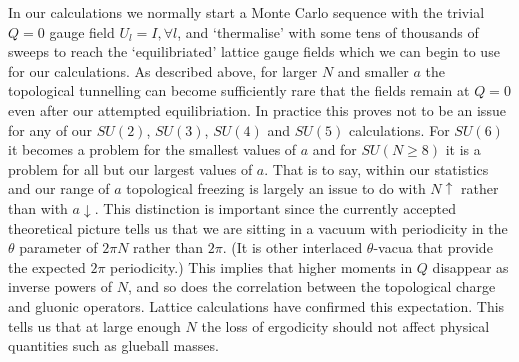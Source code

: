 \documentclass[12pt]{article}
\begin{document}
In our calculations we normally start a Monte Carlo sequence with the trivial $Q=0$
gauge field $U_l=I, \forall l$, and `thermalise' with some tens of thousands of sweeps
to reach the `equilibriated' lattice gauge fields which we can begin to use for our
calculations. As described above, for larger $N$ and smaller $a$ the topological 
tunnelling can become
sufficiently rare that the fields remain at $Q=0$ even after our attempted
equilibriation. In practice this proves not to be an issue for any of our $SU(2)$, $SU(3)$,
$SU(4)$ and $SU(5)$ calculations. For $SU(6)$ it becomes a problem for the smallest values
of $a$ and for $SU(N\geq 8)$ it is a problem for all but our largest values of $a$.
That is to say, within our statistics and our range of $a$ topological freezing
is largely an issue to do with $N\uparrow$ rather than with $a\downarrow$.
This distinction is important since the currently accepted theoretical picture
%
\cite{Witten_98}
%
tells us that we are sitting in a vacuum with periodicity in the $\theta$ parameter of
$2\pi N$ rather than $2\pi$. (It is other interlaced $\theta$-vacua that provide the
expected $2\pi$ periodicity.) This implies that higher moments in $Q$ disappear as inverse
powers of $N$, and so does the correlation between the topological charge and gluonic 
operators. Lattice calculations 
%
\cite{LDDGMEV_Q}
%
have confirmed this expectation. This tells us that at large enough $N$ the loss of
ergodicity should not affect physical quantities such as glueball masses. 
\end{document}
